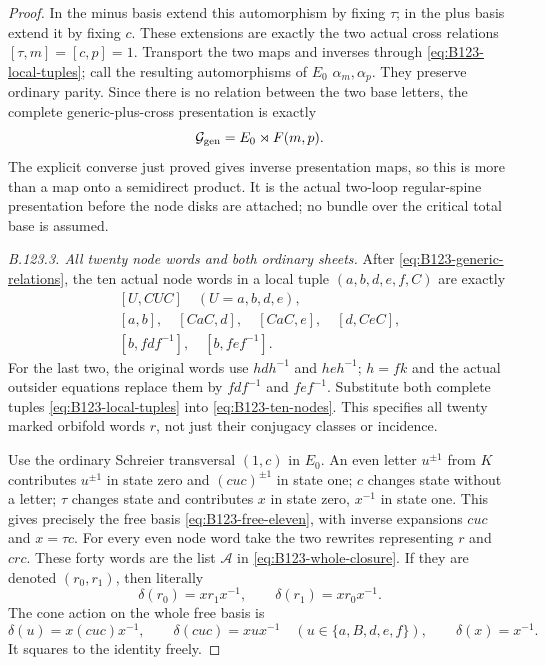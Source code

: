 \begin{proof}
In the minus basis extend this automorphism by fixing $\tau$;
in the plus basis extend it by fixing $c$. These extensions are
exactly the two actual cross relations $[\tau,m]=[c,p]=1$.
Transport the two maps and inverses through
\eqref{eq:B123-local-tuples}; call the resulting automorphisms
of $E_0$ $\alpha_m,\alpha_p$. They preserve ordinary parity.
Since there is no relation between the two base letters, the
complete generic-plus-cross presentation is exactly
\begin{equation}\label{eq:B123-generic-product}
 \mathcal G_{\rm gen}=E_0\rtimes F(m,p).
\end{equation}
The explicit converse just proved gives inverse presentation maps,
so this is more than a map onto a semidirect product. It is the
actual two-loop regular-spine presentation before the node disks
are attached; no bundle over the critical total base is assumed.

\emph{B.123.3. All twenty node words and both ordinary sheets.}
After \eqref{eq:B123-generic-relations}, the ten actual node
words in a local tuple $(a,b,d,e,f,C)$ are exactly
\begin{equation}\label{eq:B123-ten-nodes}
 \begin{gathered}
 [U,CUC]\quad(U=a,b,d,e),\\
 [a,b],\quad[CaC,d],\quad[CaC,e],\quad[d,CeC],\\
 [b,fdf^{-1}],\quad[b,fef^{-1}].
 \end{gathered}
\end{equation}
For the last two, the original words use $hdh^{-1}$ and
$heh^{-1}$; $h=fk$ and the actual outsider equations replace
them by $fdf^{-1}$ and $fef^{-1}$. Substitute both complete
tuples \eqref{eq:B123-local-tuples} into
\eqref{eq:B123-ten-nodes}. This specifies all twenty marked
orbifold words $r$, not just their conjugacy classes or incidence.

Use the ordinary Schreier transversal $(1,c)$ in $E_0$.
An even letter $u^{\pm1}$ from $K$ contributes $u^{\pm1}$
in state zero and $(cuc)^{\pm1}$ in state one; $c$ changes
state without a letter; $\tau$ changes state and contributes
$x$ in state zero, $x^{-1}$ in state one. This gives precisely
the free basis \eqref{eq:B123-free-eleven}, with inverse
expansions $cuc$ and $x=\tau c$. For every even node word take
the two rewrites representing $r$ and $crc$. These forty words
are the list $\mathcal A$ in \eqref{eq:B123-whole-closure}.
If they are denoted $(r_0,r_1)$, then literally
\begin{equation}\label{eq:B123-node-cone-mates}
 \delta(r_0)=x r_1x^{-1},\qquad
 \delta(r_1)=x r_0x^{-1}.
\end{equation}
The cone action on the whole free basis is
\begin{equation}\label{eq:B123-delta}
 \delta(u)=x(cuc)x^{-1},\qquad
 \delta(cuc)=xux^{-1}\quad(u\in\{a,B,d,e,f\}),\qquad
 \delta(x)=x^{-1}.
\end{equation}
It squares to the identity freely.


\end{proof}
